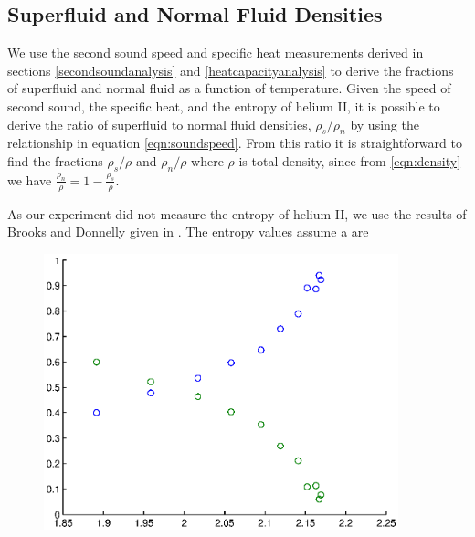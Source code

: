 \subsection{Superfluid and Normal Fluid Densities}\label{superfluiddensity}


We use the second sound speed and specific heat measurements derived
in sections \ref{secondsoundanalysis} and \ref{heatcapacityanalysis}
to derive the fractions of superfluid and normal fluid as a function
of temperature. Given the speed of second sound, the specific heat,
and the entropy of helium II, it is possible to derive the ratio of
superfluid to normal fluid densities, $\rho_s/\rho_n$ by using the
relationship in equation \ref{eqn:soundspeed}. From this ratio it is
straightforward to find the fractions $\rho_s/\rho$ and $\rho_n/\rho$
where $\rho$ is total density, since from \ref{eqn:density} we have
$\frac{\rho_n}{\rho} = 1 - \frac{\rho_s}{\rho}$.

As our experiment did not measure the entropy of helium II, we use the
results of Brooks and Donnelly given in \cite{brooks}. The entropy
values assume a are 

\begin{figure}[htbp]
\begin{center}
\includegraphics[height=80mm]{./figures/density.eps}
\caption{\small{}}
\label{fig:density}
\end{center}
\end{figure}

